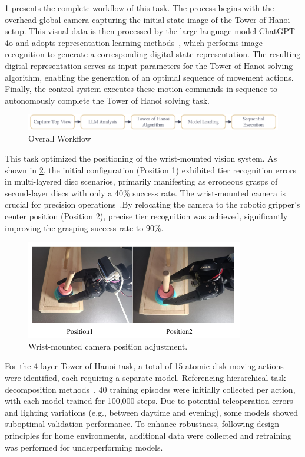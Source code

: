 \documentclass[runningheads]{llncs}
\begin{document}
\cref{fig10} presents the complete workflow of this task. The process begins with the overhead global camera capturing the initial state image of the Tower of Hanoi setup. This visual data is then processed by the large language model ChatGPT-4o and adopts representation learning methods~\cite{ref5}, which performs image recognition to generate a corresponding digital state representation. The resulting digital representation serves as input parameters for the Tower of Hanoi solving algorithm, enabling the generation of an optimal sequence of movement actions. Finally, the control system executes these motion commands in sequence to autonomously complete the Tower of Hanoi solving task.

\begin{figure}[htbp]
\centering
\includegraphics[width=\textwidth]{10}
\caption{Overall Workflow}
 \label{fig10}
\end{figure}

This task optimized the positioning of the wrist-mounted vision system. As shown in \cref{fig12}, the initial configuration (Position 1) exhibited tier recognition errors in multi-layered disc scenarios, primarily manifesting as erroneous grasps of second-layer discs with only a 40\% success rate. The wrist-mounted camera is crucial for precision operations~\cite{ref6}.By relocating the camera to the robotic gripper's center position (Position 2), precise tier recognition was achieved, significantly improving the grasping success rate to 90\%.

\begin{figure}[htbp]
\centering
\includegraphics[width=0.85\textwidth]{fig12.pdf}
\caption{Wrist-mounted camera position adjustment.} \label{fig12}
\end{figure}



For the 4-layer Tower of Hanoi task, a total of 15 atomic disk-moving actions were identified, each requiring a separate model. Referencing hierarchical task decomposition methods~\cite{ref7}, 40 training episodes were initially collected per action, with each model trained for 100,000 steps. Due to potential teleoperation errors and lighting variations (e.g., between daytime and evening)\cite{ref8}, some models showed suboptimal validation performance. To enhance robustness, following design principles for home environments\cite{ref9}, additional data were collected and retraining was performed for underperforming models.
\end{document}

